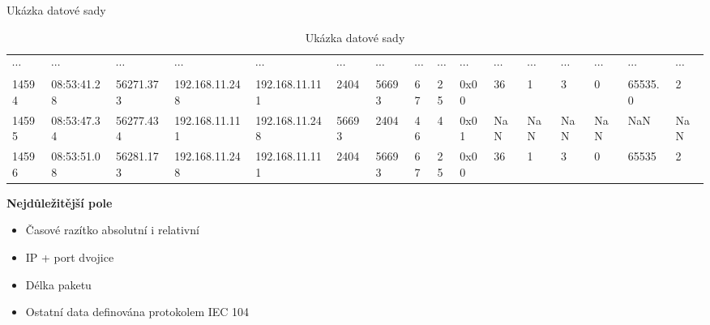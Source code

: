 \documentclass[hyperref={unicode}, xcolor={table}]{beamer}
\begin{document}
\begin{frame}[t]{Ukázka datové sady}
\begin{table}[h!]
\begin{adjustbox}{max width=\textwidth}
\begin{tabular}{|llllllllllllllll|}
                $\cdots$ & $\cdots$ & $\cdots$ & $\cdots$ & $\cdots$ & $\cdots$ & $\cdots$ & $\cdots$ & $\cdots$ & $\cdots$ & $\cdots$ & $\cdots$ & $\cdots$ & $\cdots$ & $\cdots$ & $\cdots$ \\
                14594 & 08:53:41.28 & 56271.373 & 192.168.11.248 & 192.168.11.111 & 2404 & 56693 & 67 & 25 & 0x00 & 36 & 1 & 3 & 0 & 65535.0 & 2 \\
                14595 & 08:53:47.34 & 56277.434 & 192.168.11.111 & 192.168.11.248 & 56693 & 2404 & 46 & 4 & 0x01 & NaN & NaN & NaN & NaN & NaN & NaN \\
                14596 & 08:53:51.08 & 56281.173 & 192.168.11.248 & 192.168.11.111 & 2404 & 56693 & 67 & 25 & 0x00 & 36 & 1 & 3 & 0 & 65535 & 2 \\
                \hline
            \end{tabular}
        \end{adjustbox}
    \caption{Ukázka datové sady}
    \end{table}
    
    \textbf{Nejdůležitější pole}
    \begin{itemize}
        \item Časové razítko absolutní i relativní
        \item IP + port dvojice
        \item Délka paketu
        \item Ostatní data definována protokolem IEC 104
    \end{itemize}
    
\end{frame}


\end{document}
